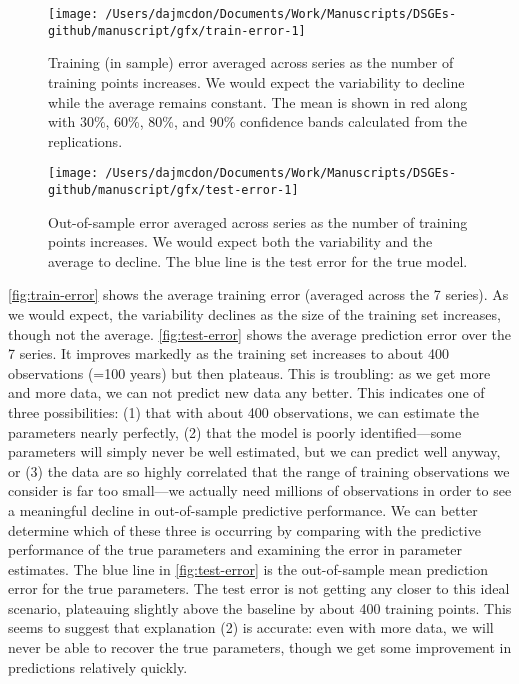 \documentclass[11pt]{article}
\begin{document}
\begin{figure}[t]

{\centering \texttt{[image: /Users/dajmcdon/Documents/Work/Manuscripts/DSGEs-github/manuscript/gfx/train-error-1]} 

}

\caption{Training (in sample) error averaged across series as the number of training points increases. We would expect the variability to decline while the average remains constant. The mean is shown in red along with 30\%, 60\%, 80\%, and 90\% confidence bands calculated from the replications.}\label{fig:train-error}
\end{figure}

\begin{figure}[t]

{\centering \texttt{[image: /Users/dajmcdon/Documents/Work/Manuscripts/DSGEs-github/manuscript/gfx/test-error-1]} 

}

\caption{Out-of-sample error averaged across series as the number of training points increases. We would expect both the variability and the average to decline. The blue line is the test error for the true model.}\label{fig:test-error}
\end{figure}

\autoref{fig:train-error} shows the average training error (averaged
across the 7 series). As we would expect, the variability declines as
the size of the training set increases, though not the average.
\autoref{fig:test-error} shows the average prediction error over the 7
series. It improves markedly as the training set increases to about 400
observations (=100 years) but then plateaus. This is troubling: as we
get more and more data, we can not predict new data any better. This
indicates one of three possibilities: (1) that with about 400
observations, we can estimate the parameters nearly perfectly, (2) that
the model is poorly identified---some parameters will simply never be
well estimated, but we can predict well anyway, or (3) the data are so
highly correlated that the range of training observations we consider is
far too small---we actually need millions of observations in order to
see a meaningful decline in out-of-sample predictive performance. We can
better determine which of these three is occurring by comparing with the
predictive performance of the true parameters and examining the error in
parameter estimates. The blue line in \autoref{fig:test-error} is the
out-of-sample mean prediction error for the true parameters. The test
error is not getting any closer to this ideal scenario, plateauing
slightly above the baseline by about 400 training points. This seems to
suggest that explanation (2) is accurate: even with more data, we will
never be able to recover the true parameters, though we get some
improvement in predictions relatively quickly.
\end{document}
